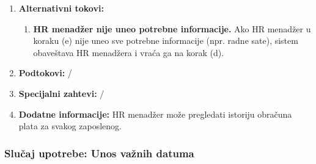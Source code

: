 \documentclass[a4paper]{article}
\begin{document}
\begin{enumerate}
    \item \textbf{Alternativni tokovi:}
        \begin{enumerate}
            \item \textbf{HR menadžer nije uneo potrebne informacije.} Ako HR menadžer u koraku (e) nije uneo sve potrebne informacije (npr. radne sate), sistem obaveštava HR menadžera i vraća ga na korak (d).
        \end{enumerate}
    \item \textbf{Podtokovi:} /
    \item \textbf{Specijalni zahtevi:} /
    \item \textbf{Dodatne informacije:} HR menadžer može pregledati istoriju obračuna plata za svakog zaposlenog.
\end{enumerate}

\subsubsection{Slučaj upotrebe: Unos važnih datuma}
\end{document}
